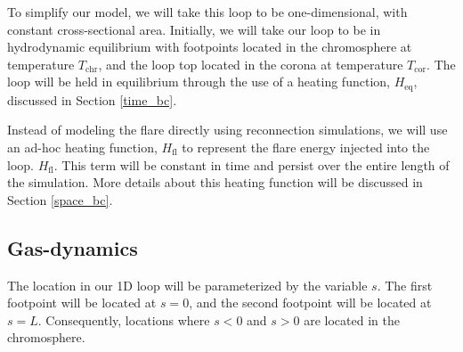 \documentclass[iop]{emulateapj}
\begin{document}
			To simplify our model, we will take this loop to be one-dimensional, with constant cross-sectional area. Initially, we will take our loop to be in hydrodynamic equilibrium with footpoints located in the chromosphere at temperature $T_{\text{chr}}$, and the loop top located in the corona at temperature $T_{\text{cor}}$. The loop will be held in equilibrium through the use of a heating function, $H_{\text{eq}}$, discussed in Section \ref{time_bc}.
			
			Instead of modeling the flare directly using reconnection simulations, we will use an ad-hoc heating function, $H_\text{fl}$ to represent the flare energy injected into the loop. $H_\text{fl}$. This term will be constant in time and persist over the entire length of the simulation. More details about this heating function will be discussed in Section \ref{space_bc}.
			
		\subsection{Gas-dynamics}
			
				The location in our 1D loop will be parameterized by the variable $s$. The first footpoint will be located at $s=0$, and the second footpoint will be located at $s=L$. Consequently, locations where $s < 0$ and $s > 0$ are located in the chromosphere.
				
\end{document}
